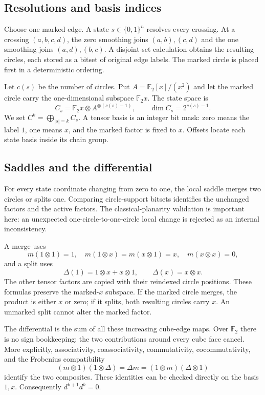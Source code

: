 \documentclass[11pt]{article}
\theoremstyle{definition}
\newcommand{\F}{\mathbb F_2}
\begin{document}
\subsection{Resolutions and basis indices}

Choose one marked edge. A state $s\in\{0,1\}^n$ resolves every crossing. At a
crossing $(a,b,c,d)$, the zero smoothing joins $(a,b),(c,d)$ and the one smoothing
joins $(a,d),(b,c)$. A disjoint-set calculation obtains the resulting circles,
each stored as a bitset of original edge labels. The marked circle is placed
first in a deterministic ordering.

Let $c(s)$ be the number of circles. Put $A=\F[x]/(x^2)$ and let the marked
circle carry the one-dimensional subspace $\F x$. The state space is
\[
 C_s=\F x\otimes A^{\otimes(c(s)-1)},\qquad
 \dim C_s=2^{c(s)-1}.
\]
We set $C^k=\bigoplus_{|s|=k}C_s$. A tensor basis is an integer bit mask:
zero means the label $1$, one means $x$, and the marked factor is fixed to $x$.
Offsets locate each state basis inside its chain group.

\subsection{Saddles and the differential}

For every state coordinate changing from zero to one, the local saddle merges
two circles or splits one. Comparing circle-support bitsets identifies the
unchanged factors and the active factors. The classical-planarity validation is
important here: an unexpected one-circle-to-one-circle local change is rejected
as an internal inconsistency.

A merge uses
\[
 m(1\otimes1)=1,\quad m(1\otimes x)=m(x\otimes1)=x,
 \quad m(x\otimes x)=0,
\]
and a split uses
\[
 \Delta(1)=1\otimes x+x\otimes1,\qquad \Delta(x)=x\otimes x.
\]
The other tensor factors are copied with their reindexed circle positions.
These formulas preserve the marked-$x$ subspace. If the marked circle merges,
the product is either $x$ or zero; if it splits, both resulting circles carry
$x$. An unmarked split cannot alter the marked factor.

The differential is the sum of all these increasing cube-edge maps. Over $\F$
there is no sign bookkeeping: the two contributions around every cube face
cancel. More explicitly, associativity, coassociativity, commutativity,
cocommutativity, and the Frobenius compatibility
\[
 (m\otimes1)(1\otimes\Delta)=\Delta m
 =(1\otimes m)(\Delta\otimes1)
\]
identify the two composites. These identities can be checked directly on the
basis $1,x$. Consequently $d^{k+1}d^k=0$.
\end{document}
